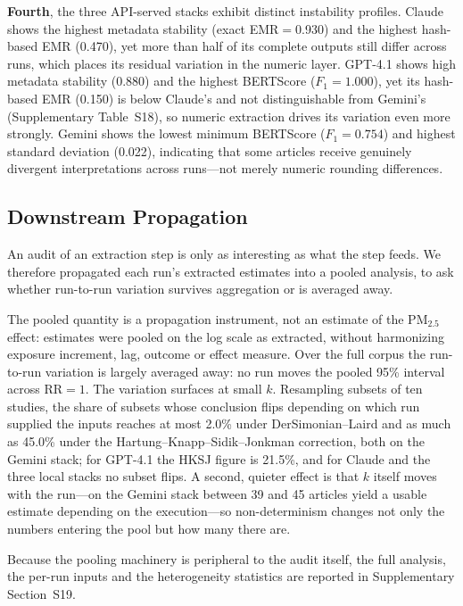 \documentclass[preprint,review,12pt,authoryear]{elsarticle}
\begin{document}
\textbf{Fourth}, the three API-served stacks exhibit distinct instability profiles.
Claude shows the highest metadata stability (exact EMR${=}$0.930) and the highest hash-based EMR (0.470), yet more than half of its complete outputs still differ across runs, which places its residual variation in the numeric layer.
GPT-4.1 shows high metadata stability (0.880) and the highest BERTScore ($F_1{=}1.000$), yet its hash-based EMR (0.150) is below Claude's and not distinguishable from Gemini's (Supplementary Table~S18), so numeric extraction drives its variation even more strongly.
Gemini shows the lowest minimum BERTScore ($F_1{=}0.754$) and highest standard deviation (0.022), indicating that some articles receive genuinely divergent interpretations across runs---not merely numeric rounding differences.

\subsection{Downstream Propagation}
\label{sec:metaprop}

An audit of an extraction step is only as interesting as what the step feeds. We therefore
propagated each run's extracted estimates into a pooled analysis, to ask whether run-to-run
variation survives aggregation or is averaged away.

The pooled quantity is a propagation instrument, not an estimate of the PM$_{2.5}$ effect: estimates
were pooled on the log scale as extracted, without harmonizing exposure increment, lag, outcome or effect
measure. Over the full corpus the run-to-run variation is largely averaged away: no run moves the pooled
95\% interval across RR${=}1$. The variation surfaces at small $k$. Resampling subsets of ten studies,
the share of subsets whose conclusion flips depending on which run supplied the inputs reaches
at most 2.0\% under DerSimonian--Laird and as much as 45.0\% under the Hartung--Knapp--Sidik--Jonkman
correction, both on the Gemini stack; for GPT-4.1 the HKSJ figure is 21.5\%, and for Claude and the
three local stacks no subset flips. A second, quieter effect is that $k$ itself moves with the
run---on the Gemini stack between 39 and 45 articles yield a usable estimate depending on the
execution---so non-determinism changes not only the numbers entering the pool but how many there are.

Because the pooling machinery is peripheral to the audit itself, the full analysis, the
per-run inputs and the heterogeneity statistics are reported in Supplementary Section~S19.
\end{document}
